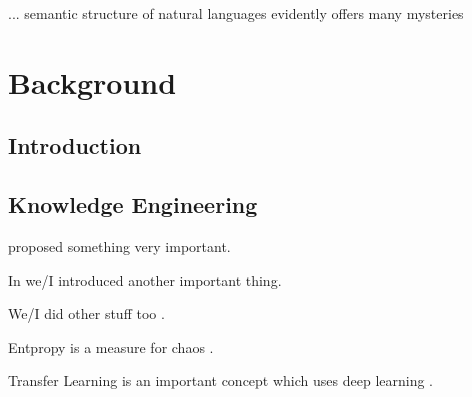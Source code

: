 
\begin{savequote}[8cm]
... semantic structure of natural languages evidently offers many mysteries
\end{savequote}

\chapter{Background}\label{ch:background}

\minitoc

\section{Introduction}

\kant[10] 

\section{Knowledge Engineering}

\citet{sowa-2000-knowledgerepr} proposed something very important.

In \citep{turing-1948-intelligentmachinery} we/I introduced another important thing.

We/I did other stuff too \citep{turing-1950-computingmachinery}.


Entpropy is a measure for chaos \cite{shannon-1948-entropy}.

Transfer Learning is an important concept \cite{ruder-2019-phdthesis,ruder-2019-transferlearning} which uses deep learning \citep{goodfellow-2016-dlbook}.

